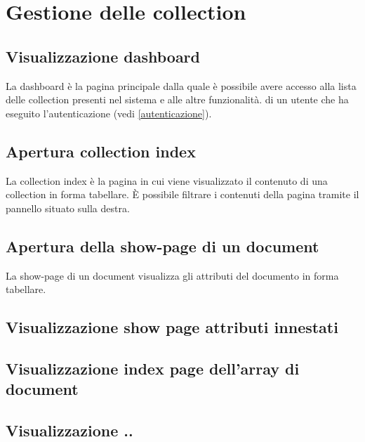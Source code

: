 \section{Gestione delle collection}

	\subsection{Visualizzazione dashboard} %
	\label{visualizzazionedashboard}
	La dashboard è la pagina principale dalla quale è possibile avere accesso alla lista delle collection presenti nel sistema e alle altre funzionalità.
	di un utente che ha eseguito l'autenticazione (vedi \ref{autenticazione}).
	

	\subsection{Apertura collection index} %
	\label{aperturacollectionindex}
	La collection index è la pagina in cui viene visualizzato il contenuto di una collection in forma tabellare. \`E possibile filtrare i contenuti della pagina tramite il pannello situato sulla destra.
	

	\subsection{Apertura della show-page di un document} %
	La show-page di un document visualizza gli attributi del documento in forma tabellare.


	\subsection{Visualizzazione show page attributi innestati} %

	\subsection{Visualizzazione index page dell'array di document} %




	




	\subsection{Visualizzazione ..}
	
